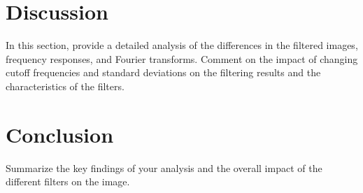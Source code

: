 \documentclass{article}
\begin{document}
\section{Discussion}

In this section, provide a detailed analysis of the differences in the filtered images, frequency responses, and Fourier transforms. Comment on the impact of changing cutoff frequencies and standard deviations on the filtering results and the characteristics of the filters.

\section{Conclusion}

Summarize the key findings of your analysis and the overall impact of the different filters on the image.
\end{document}
